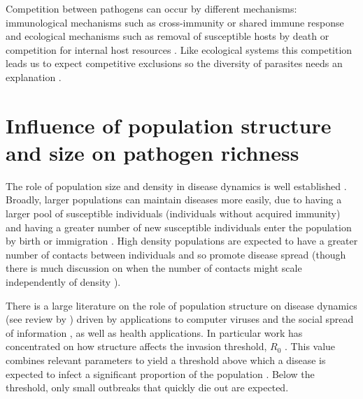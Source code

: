 Competition between pathogens can occur by different mechanisms: immunological mechanisms such as cross-immunity or shared immune response \cite{fenton2010applying} and ecological mechanisms such as removal of susceptible hosts by death \cite{rohani2003ecological} or competition for internal host resources \cite{griffiths2014analysis}.
Like ecological systems this competition leads us to expect competitive exclusions so the diversity of parasites needs an explanation \cite{bremermann1989competitive, martcheva2013competitive, ackleh2003competitive, ackleh2014robust, turner2002impact}.



\section{Influence of population structure and size on pathogen richness}




The role of population size and density in disease dynamics is well established \cite{may1979population, anderson1979population, heesterbeek2002brief, lloyd2005should}.
Broadly, larger populations can maintain diseases more easily, due to having a larger pool of susceptible individuals (individuals without acquired immunity) and having a greater number of new susceptible individuals enter the population by birth or immigration \cite{may1979population, anderson1979population}.
High density populations are expected to have a greater number of contacts between individuals and so promote disease spread (though there is much discussion on when the number of contacts might scale independently of density \cite{mccallum2001should}).


There is a large literature on the role of population structure on disease dynamics (see review by \textcite{pastor2015epidemic}) driven by applications to computer viruses \cite{pastor2001epidemic} and the social spread of information \cite{goffman1964generalization}, as well as health applications.
In particular work has concentrated on how structure affects the invasion threshold, $R_0$ \cite{colizza2007invasion, barthelemy2010fluctuation, wu2013threshold, may2001infection, pastor2001epidemic}. 
This value combines relevant parameters to yield a threshold above which a disease is expected to infect a significant proportion of the population \cite{may1979population, anderson1979population}.
Below the threshold, only small outbreaks that quickly die out are expected.


